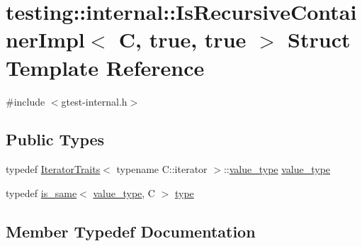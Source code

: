 \hypertarget{structtesting_1_1internal_1_1_is_recursive_container_impl_3_01_c_00_01true_00_01true_01_4}{}\section{testing\+::internal\+::Is\+Recursive\+Container\+Impl$<$ C, true, true $>$ Struct Template Reference}
\label{structtesting_1_1internal_1_1_is_recursive_container_impl_3_01_c_00_01true_00_01true_01_4}


{\ttfamily \#include $<$gtest-\/internal.\+h$>$}

\subsection*{Public Types}
\begin{DoxyCompactItemize}
\item 
typedef \mbox{\hyperlink{structtesting_1_1internal_1_1_iterator_traits}{Iterator\+Traits}}$<$ typename C\+::iterator $>$\+::\mbox{\hyperlink{structtesting_1_1internal_1_1_is_recursive_container_impl_3_01_c_00_01true_00_01true_01_4_a8bbf5f5dec769e84b6f5a2e1fdb503e8}{value\+\_\+type}} \mbox{\hyperlink{structtesting_1_1internal_1_1_is_recursive_container_impl_3_01_c_00_01true_00_01true_01_4_a8bbf5f5dec769e84b6f5a2e1fdb503e8}{value\+\_\+type}}
\item 
typedef \mbox{\hyperlink{structtesting_1_1internal_1_1is__same}{is\+\_\+same}}$<$ \mbox{\hyperlink{structtesting_1_1internal_1_1_is_recursive_container_impl_3_01_c_00_01true_00_01true_01_4_a8bbf5f5dec769e84b6f5a2e1fdb503e8}{value\+\_\+type}}, C $>$ \mbox{\hyperlink{structtesting_1_1internal_1_1_is_recursive_container_impl_3_01_c_00_01true_00_01true_01_4_a6bf4fa07dd1c22c5d0ca4ed99c546e9c}{type}}
\end{DoxyCompactItemize}


\subsection{Member Typedef Documentation}
\mbox{\label{structtesting_1_1internal_1_1_is_recursive_container_impl_3_01_c_00_01true_00_01true_01_4_a6bf4fa07dd1c22c5d0ca4ed99c546e9c}} 
